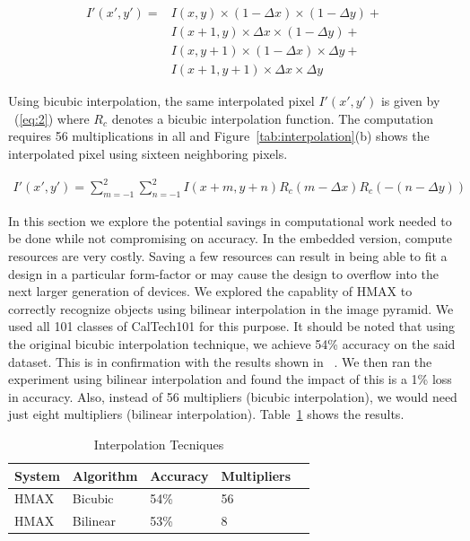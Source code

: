 \begin{equation}
\begin{split}
I'(x',y') = &I(x,y) \times (1-\Delta x) \times (1-\Delta y) +\\ 
            &I(x+1,y) \times\Delta x \times (1-\Delta y) +\\ 
            &I(x,y+1) \times (1-\Delta x) \times\Delta y +\\ 
            &I(x+1,y+1) \times\Delta x \times\Delta y 
\end{split}
\label{eq:1}
\end{equation}

Using bicubic interpolation, the same interpolated pixel $I'(x',y')$ is given by ~(\ref{eq:2}) where 
$R_c$ denotes a bicubic interpolation function. The computation requires 56 multiplications in all and Figure~\ref{tab:interpolation}(b) shows the interpolated pixel 
using sixteen neighboring pixels.

\begin{equation}
\begin{split}
I'(x',y')=\sum_{m=-1}^{2}\sum_{n=-1}^{2}I(x+m,y+n)R_c(m-\Delta x)R_c(-(n-\Delta y))
\end{split}
\label{eq:2}
\end{equation}

In this section we explore the potential savings in computational work needed to be done while not compromising on accuracy. 
In the embedded version, compute resources are very costly. Saving a few resources can result in being able to 
fit a design in a particular form-factor or may cause the design to overflow into the next larger generation of devices. We explored the 
capablity of HMAX to correctly recognize objects using bilinear interpolation in the image pyramid. We used all 101 classes of CalTech101 
for this purpose. It should be noted that using the original bicubic interpolation technique, we achieve 54\% accuracy on the said dataset. This is in confirmation with the results shown in ~\cite{Mutch2008}. 
We then ran the experiment using bilinear interpolation and found the impact of this is a 1\% loss in accuracy. Also, instead of 
56 multipliers (bicubic interpolation), we would need just eight multipliers (bilinear interpolation). Table~\ref{table:compute} shows the 
results. 

\begin{table}[h]
\renewcommand{\arraystretch}{1.3}
\caption {Interpolation Tecniques}
\label{table:compute}
\centering
\begin{tabular}{lllll}
 System & Algorithm & Accuracy & Multipliers\\\hline
 HMAX	& Bicubic   & 54\% & 56\\\hline
 HMAX   & Bilinear  & 53\% & 8\\\hline
\end{tabular}
\end{table}
